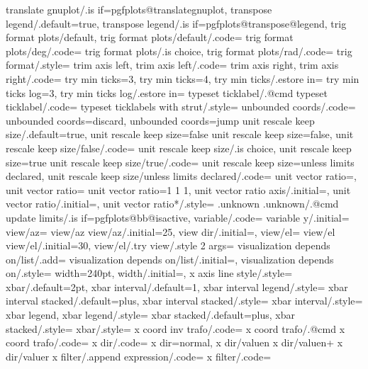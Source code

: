 {{{{{{{{{{{{{{{{{{{{{{{{{{{{{{{{{{{{{{{{{{{{{{{{{{{{{{{{{{{{{{{{{{{{{{{{{{{{{{{{{{{{{{{{{{{{{{{{{{{{{{{{{{{{{{{{{{{{{{{{{{{{{{{{{{{{{{{{{{{{{{{{{{{{{{{{{{{{{{{{{{{{{{{{{{{{{{{{{{{{{{{{{{{{{{{{{{{{{{{{{{{{{{{{{{{{{{{{{{{{{{{{{{{{{{{{{{{{{{{{{{{{{{{{{{{{{{{{{{{{{{{{{{{{{{{{{{{{{{{{{{{{{{{{{{{{{{{{{{{{{{{{{{{{{{{{{{{{{{{{{{{{{{{{{{{{{{{{{{{{{{{{{{{{{{{{{{{{{{{{{{{{{{{{{{{{{{{{{{{{{{{{{{{{{{{{{{{{{{{{{{{{{{{{{{{{{{{{{{{{{{{{{{{{{{{{{{{{{{{{{{{{{{{{{{{{{{{{{{{{{{{{{{{{{{{{{{{{{{{{{{{{{{{{{{{{{{{{{{{{{{{{{{{{{{{{{{{{{{{{{{{{{{{{{{{{{{{{{{{{{{{{{{{{{{{{{{{{{{{{{{{{{{{{{{{{{{{{{{{{{{{{{{{{{{{{{{{{{{{{{{{{{{{{{{{{{{{{{{{{{{{{{{{{{{{{{{{{{{{{{{{{{{{{{{{{{{{{{{{{{{{{{{translate gnuplot/.is if=pgfplots@translategnuplot,
transpose legend/.default=true,
transpose legend/.is if=pgfplots@transpose@legend,
trig format plots/default,
trig format plots/default/.code={
trig format plots/deg/.code={
trig format plots/.is choice,
trig format plots/rad/.code={
trig format/.style={
trim axis left,
trim axis left/.code={
trim axis right,
trim axis right/.code={
try min ticks=3,
try min ticks=4,
try min ticks/.estore in=			
try min ticks log=3,
try min ticks log/.estore in=			
typeset ticklabel/.@cmd{
typeset ticklabel/.code={
typeset ticklabels with strut/.style={
unbounded coords/.code={
unbounded coords=discard,
unbounded coords=jump
unit rescale keep size/.default=true,
unit rescale keep size=false
unit rescale keep size=false,
unit rescale keep size/false/.code={
unit rescale keep size/.is choice,
unit rescale keep size=true
unit rescale keep size/true/.code={
unit rescale keep size=unless limits declared,
unit rescale keep size/unless limits declared/.code={
unit vector ratio=,
unit vector ratio={
unit vector ratio=1 1 1,
unit vector ratio axis/.initial=,
unit vector ratio/.initial=,
unit vector ratio*/.style={
.unknown{
.unknown/.@cmd
update limits/.is if=pgfplots@bb@isactive,
variable/.code={
variable y/.initial=
view/az={
view/az{
view/az/.initial=25,
view dir/.initial=,
view/el={
view/el{
view/el/.initial=30,
view/el/.try
view/.style 2 args={
visualization depends on/list/.add={
visualization depends on/list/.initial=,
visualization depends on/.style={
width=240pt,
width/.initial=,
x axis line style/.style={
xbar/.default=2pt,
xbar interval/.default=1,
xbar interval legend/.style={
xbar interval stacked/.default=plus,
xbar interval stacked/.style={
xbar interval/.style={
xbar legend,
xbar legend/.style={
xbar stacked/.default=plus,
xbar stacked/.style={
xbar/.style={
x coord inv trafo/.code={
x coord trafo/.@cmd
x coord trafo/.code={
x dir/.code={
x dir=normal,
x dir/valuen
x dir/valuen+
x dir/valuer
x filter/.append expression/.code=
x filter/.code={
}}}}}}}}}}}}}}}}}}}}}}}}}}}}}}}}}}}}}}}}}}}}}}}}}}}}}}}}}}}}}}}}}}}}}}}}}}}}}}}}}}}}}}}}}}}}}}}}}}}}}}}}}}}}}}}}}}}}}}}}}}}}}}}}}}}}}}}}}}}}}}}}}}}}}}}}}}}}}}}}}}}}}}}}}}}}}}}}}}}}}}}}}}}}}}}}}}}}}}}}}}}}}}}}}}}}}}}}}}}}}}}}}}}}}}}}}}}}}}}}}}}}}}}}}}}}}}}}}}}}}}}}}}}}}}}}}}}}}}}}}}}}}}}}}}}}}}}}}}}}}}}}}}}}}}}}}}}}}}}}}}}}}}}}}}}}}}}}}}}}}}}}}}}}}}}}}}}}}}}}}}}}}}}}}}}}}}}}}}}}}}}}}}}}}}}}}}}}}}}}}}}}}}}}}}}}}}}}}}}}}}}}}}}}}}}}}}}}}}}}}}}}}}}}}}}}}}}}}}}}}}}}}}}}}}}}}}}}}}}}}}}}}}}}}}}}}}}}}}}}}}}}}}}}}}}}}}}}}}}}}}}}}}}}}}}}}}}}}}}}}}}}}}}}}}}}}}}}}}}}}}}}}}}}}}}}}}}}}}}}}}}}}}}}}}}}}}}}}}}}}}}}}}}}}}}}}}}}}}}}}}}}}}}}}}}}}}}}}}}}}}}}}}}}}}}}}}}}}}}}}}}}}}}}}}}}}}}}}}}}}}}}}}}}}}}}}}}}}}}}}
